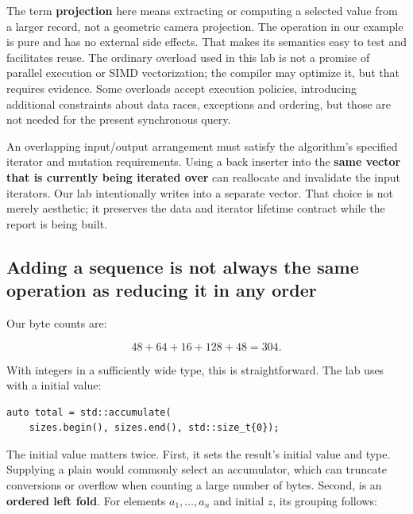 The term \textbf{projection} here means extracting or computing a selected value from a larger record, not a geometric camera projection. The operation in our example is pure and has no external side effects. That makes its semantics easy to test and facilitates reuse. The ordinary  overload used in this lab is not a promise of parallel execution or SIMD vectorization; the compiler may optimize it, but that requires evidence. Some overloads accept execution policies, introducing additional constraints about data races, exceptions and ordering, but those are not needed for the present synchronous query.

An overlapping input/output arrangement must satisfy the algorithm's specified iterator and mutation requirements. Using a back inserter into the \textbf{same vector that is currently being iterated over} can reallocate and invalidate the input iterators. Our lab intentionally writes into a separate vector. That choice is not merely aesthetic; it preserves the data and iterator lifetime contract while the report is being built.

\subsection{Adding a sequence is not always the same operation as reducing it in any order}\label{01-foundations-i-ch006-adding-a-sequence-is-not-always-the-same-operation-as-reducing-it-in-any-order}

\hypertarget{01-foundations-i-ch006-adding-a-sequence-is-not-always-the-same-operation-as-reducing-it-in-any-order}{}

Our byte counts are:

\[
48+64+16+128+48 = 304.
\]

With integers in a sufficiently wide type, this is straightforward. The lab uses  with a  initial value:

\begin{verbatim}
auto total = std::accumulate(
    sizes.begin(), sizes.end(), std::size_t{0});
\end{verbatim}

The initial value matters twice. First, it sets the result's initial value and type. Supplying a plain  would commonly select an  accumulator, which can truncate conversions or overflow when counting a large number of bytes. Second,  is an \textbf{ordered left fold}. For elements \(a_1,\ldots,a_n\) and initial \(z\), its grouping follows:

